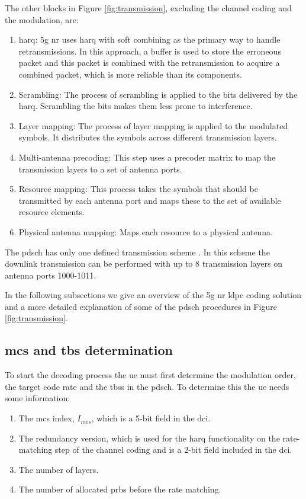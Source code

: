 The other blocks in Figure \ref{fig:transmission}, excluding the channel coding and the modulation, are:
\begin{enumerate}
	\item \Gls{harq}: \gls{5g} \gls{nr} uses \gls{harq} with soft combining as the primary way to handle retransmissions. In this approach, a buffer is used to store the erroneous packet and this packet is combined with the retransmission to acquire a combined packet, which is more reliable than its components.
	\item Scrambling: The process of scrambling is applied to the bits delivered by the \gls{harq}. Scrambling the bits makes them less prone to interference.
	\item Layer mapping: The process of layer mapping is applied to the modulated symbols. It distributes the symbols across different transmission layers.
	\item Multi-antenna precoding: This step uses a precoder matrix to map the transmission layers to a set of antenna ports.
	\item Resource mapping: This process takes the symbols that should be transmitted by each antenna port and maps these to the set of available resource elements.
	\item Physical antenna mapping: Maps each resource to a physical antenna.
\end{enumerate}

The \gls{pdsch} has only one defined transmission scheme \cite{3gpp.38.214}.
%
In this scheme the downlink transmission can be performed with up to 8 transmission layers on antenna ports 1000-1011.
%


In the following subsections we give an overview of the \gls{5g} \gls{nr} \gls{ldpc} coding solution and a more detailed explanation of some of the \gls{pdsch} procedures in Figure \ref{fig:transmission}.




\subsection{\Acl{mcs} and \acl{tbs} determination}

To start the decoding process the \gls{ue} must first determine the modulation order, the target code rate and the \glspl{tbs} in the \gls{pdsch}.
%
To determine this the \gls{ue} needs some information:

\begin{enumerate}
    \item The \gls{mcs} index, $I_{mcs}$, which is a 5-bit field in the \gls{dci}.
    \item The redundancy version, which is used for the \gls{harq} functionality on the rate-matching step of the channel coding and is a 2-bit field included in the \gls{dci}.
    \item The number of layers.
    \item The number of allocated \glspl{prb} before the rate matching.
\end{enumerate}

